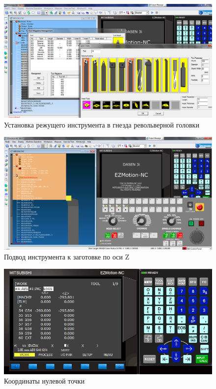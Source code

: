 \begin{figure}[ht]
\centering
    \includegraphics[scale=0.4]{8.png}
    \caption{Установка режущего инструмента в гнезда револьверной головки\label{fig:tools}}
\end{figure}

\begin{figure}[ht]
\centering
	\includegraphics[scale=0.45]{2.png}
    \caption{Подвод инструмента к заготовке по оси Z\label{fig:z}}
\end{figure}

\begin{figure}[ht]
\centering
	\includegraphics[scale=0.8]{3.png}
    \caption{Координаты нулевой точки\label{fig:coordinates}}
\end{figure}

